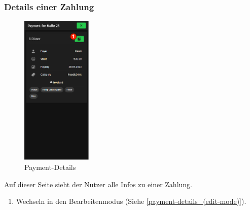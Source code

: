 \subsubsection{Details einer Zahlung}\label{payment-details}
\begin{figure}[H]
    \centering
    \includegraphics[width=0.3\textwidth]{img/pages_numbers/payment-details.drawio}
    \caption[Payment-Details]{Payment-Details}
    \label{fig:payment-details}
\end{figure}
Auf dieser Seite sieht der Nutzer alle Infos zu einer Zahlung.
\begin{enumerate}[label=\protect\circled{\arabic*}]
	\item Wechseln in den Bearbeitenmodus (Siehe \ref{payment-details_(edit-mode)}).
\end{enumerate}

